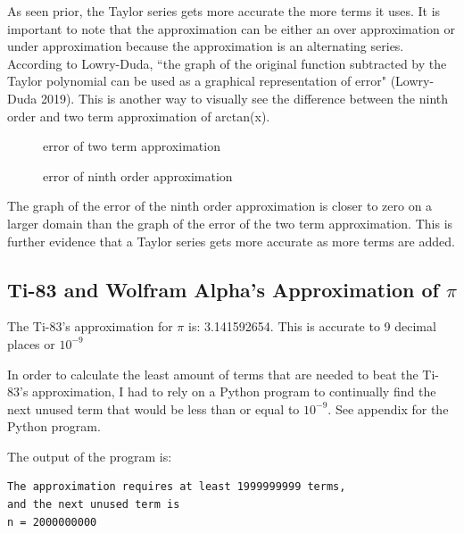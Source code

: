 \documentclass[12pt, titlepage]{article}
\begin{document}
As seen prior, the Taylor series gets more accurate the more terms it uses. It is important to note that the approximation can be either an over approximation or under approximation because the approximation is an alternating series. According to Lowry-Duda, ``the graph of the original function subtracted by the Taylor polynomial can be used as a graphical representation of error" (Lowry-Duda 2019). This is another way to visually see the difference between the ninth order and two term approximation of arctan(x). 

\begin{figure}[H]
\centering
    \caption[]{error of two term approximation}
\end{figure}

\begin{figure}[H]
\centering
    \caption[]{error of ninth order approximation}
\end{figure}

The graph of the error of the ninth order approximation is closer to zero on a larger domain than the graph of the error of the two term approximation. This is further evidence that a Taylor series gets more accurate as more terms are added.

\subsection{Ti-83 and Wolfram Alpha's Approximation of \(\pi\)}
The Ti-83's approximation for \(\pi\) is: 3.141592654. This is accurate to 9 decimal places or \(10^{-9}\)

In order to calculate the least amount of terms that are needed to beat the Ti-83's approximation, I had to rely on a Python program to continually find the next unused term that would be less than or equal to \(10^{-9}\). See appendix for the Python program.

The output of the program is:
\begin{verbatim}
The approximation requires at least 1999999999 terms, 
and the next unused term is 
n = 2000000000
\end{verbatim}
\end{document}
